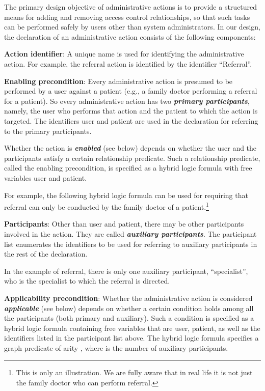 \documentclass{acm_proc_article-sp}
\newcommand{\Dfn}[1]{\textbf{\emph{#1}}}
\begin{document}
The primary design objective of administrative actions is to provide a
structured means for adding and removing access control relationships,
so that such tasks can be performed safely by users other than system
administrators.  In our design, the declaration of an administrative
action consists of the following components:
\begin{compactitem}
\item \textbf{Action identifier}: A unique name is used for
  identifying the administrative action.  For example, the
  referral action is identified by the identifier 
  ``\textsf{Referral}''.
\item \textbf{Enabling precondition}: Every administrative action is
  presumed to be performed by a user against a patient (e.g., a family
  doctor performing a referral for a patient).  So every
  administrative action has two \Dfn{primary participants}, namely,
  the user who performs that action and the patient to which the
  action is targeted.  The identifiers \textsf{user} and
  \textsf{patient} are used in the declaration for referring to
  the primary participants.

  Whether the action is \Dfn{enabled} (see below) depends on whether
  the user and the participants satisfy a certain relationship
  predicate.  Such a relationship predicate, called the enabling
  precondition, is specified as a hybrid logic formula with free
  variables \textsf{user} and \textsf{patient}.

  For example, the following hybrid logic formula can be
  used for requiring that referral can only be conducted
  by the family doctor of a patient.\footnote{This is only
  an illustration. We are fully aware that in real life
  it is not just the family doctor who can perform referral.}

\item \textbf{Participants}: Other than \textsf{user} and
  \textsf{patient}, there may be other participants involved in the
  action.  They are called \Dfn{auxiliary participants}.  The
  participant list enumerates the identifiers to be used for referring
  to auxiliary participants in the rest of the declaration.

  In the example of referral, there is only one auxiliary 
  participant, ``\textsf{specialist}'', who is the specialist
  to which the referral is directed.
\item \textbf{Applicability precondition}: Whether the administrative
  action is considered \Dfn{applicable} (see below) depends on whether
  a certain condition holds among all the participants (both primary
  and auxiliary).  Such a condition is specified as a hybrid logic
  formula containing free variables that are \textsf{user},
  \textsf{patient}, as well as the identifiers listed in the
  participant list above.  The hybrid logic formula specifies
  a graph predicate of arity , where  is the
  number of auxiliary participants.


\end{compactitem}
\end{document}
